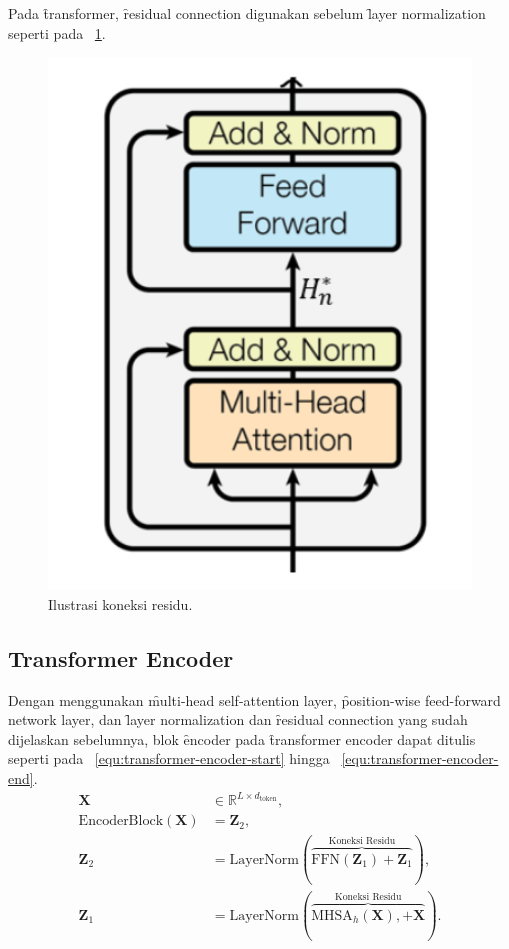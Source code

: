 	Pada \f{transformer}, \f{residual connection} digunakan sebelum \f{layer normalization} seperti pada \pic~\ref{fig:residual-connection-transformers}.
	\begin{figure}
		\centering
		\includegraphics[width=1\textwidth]{assets/pics/residual-connection-transformer.png}
		\caption{Ilustrasi koneksi residu.}
		\label{fig:residual-connection-transformers}
	\end{figure}

	\subsection{Transformer Encoder}
	\label{sec:encoder}

	Dengan menggunakan \f{multi-head self-attention layer}, \f{position-wise feed-forward network layer}, dan \f{layer normalization} dan \f{residual connection} yang sudah dijelaskan sebelumnya, blok \f{encoder} pada \f{transformer encoder} dapat ditulis seperti pada \equ~\ref{equ:transformer-encoder-start} hingga \equ~\ref{equ:transformer-encoder-end}.
	\begin{align}
	\mathbf{X} &\in \mathbb{R}^{L \times d_{\text{token}}}, \\
	\text{EncoderBlock}(\mathbf{X}) &= \mathbf{Z}_2, \\
	\mathbf{Z}_2 &= \text{LayerNorm}(\overbrace{\text{FFN}(\mathbf{Z}_1)+\mathbf{Z}_1}^{\text{Koneksi Residu}}), \\
	\mathbf{Z}_1 &= \text{LayerNorm}(\overbrace{\text{MHSA}_h(\mathbf{X}), + \mathbf{X}}^{\text{Koneksi Residu}}). \\
	\end{align}

